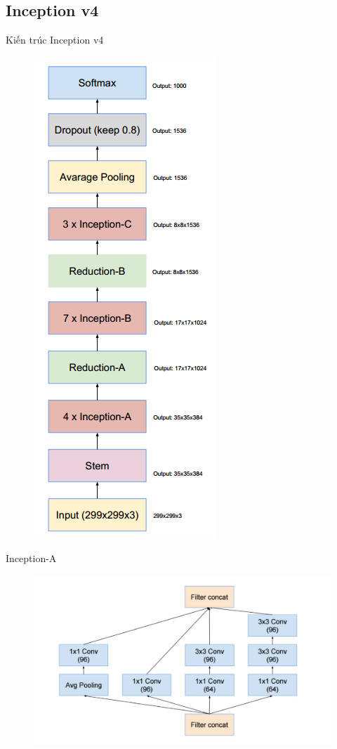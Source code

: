 \documentclass[compress]{beamer}
\begin{document}
\subsection{Inception v4}
\begin{frame}{Kiến trúc Inception v4}
\begin{figure}[H]
\includegraphics[scale=0.3]{inceptionv4.png}
\end{figure}
\end{frame}

\begin{frame}{Inception-A}
\begin{figure}[H]
\includegraphics[scale=0.29]{inceptionA.jpg}
\end{figure}
\end{frame}
\end{document}
